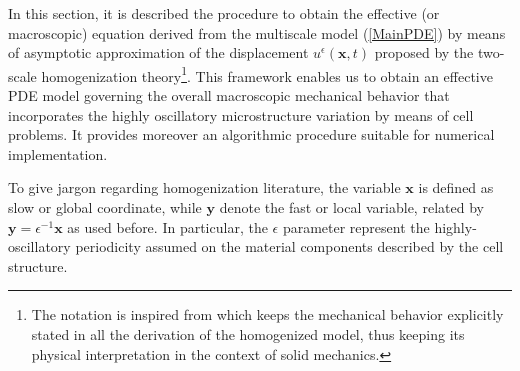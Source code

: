  In this section, it is described the procedure to obtain the effective (or macroscopic) equation derived from the multiscale model (\ref{MainPDE}) by means of asymptotic approximation of the displacement $u^{\epsilon}(\mathbf{x},t)$ proposed by the two-scale homogenization theory\footnote{The notation is inspired from \cite{altenbach2018generalized} which keeps the mechanical behavior explicitly stated in all the derivation of the homogenized model, thus keeping its physical interpretation in the context of solid mechanics.}. This framework enables us to obtain an effective PDE model governing the overall macroscopic mechanical behavior that incorporates the highly oscillatory microstructure variation by means of cell problems. It provides moreover an algorithmic procedure suitable for numerical implementation.

To give jargon regarding homogenization literature, the variable $\mathbf{x}$ is defined as slow or global coordinate, while $\mathbf{y}$ denote the fast or local variable, related by $\mathbf{y} = \epsilon^{-1}\mathbf{x}$ as used before. In particular, the $\epsilon$ parameter represent the highly-oscillatory periodicity assumed on the material components described by the cell structure.
